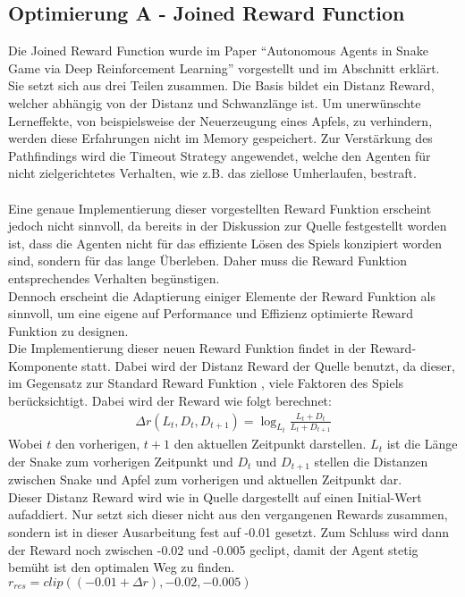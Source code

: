 \subsection{Optimierung A - Joined Reward Function} \label{subsec:Konzept_Optimierung01}
Die Joined Reward Function wurde im Paper "`Autonomous Agents in Snake Game via Deep Reinforcement Learning"' \cite{Autonomous_Agents_in_Snake_Game_via_DRL} vorgestellt und im Abschnitt  erklärt. Sie setzt sich aus drei Teilen zusammen. Die Basis bildet ein Distanz Reward, welcher abhängig von der Distanz und Schwanzlänge ist. Um unerwünschte Lerneffekte, von beispielsweise der Neuerzeugung eines Apfels, zu verhindern, werden diese Erfahrungen nicht im Memory gespeichert. Zur Verstärkung des Pathfindings wird die Timeout Strategy angewendet, welche den Agenten für nicht zielgerichtetes Verhalten, wie z.B. das ziellose Umherlaufen, bestraft.\\
\\Eine genaue Implementierung dieser vorgestellten Reward Funktion erscheint jedoch nicht sinnvoll, da bereits in der Diskussion  zur Quelle \cite{Autonomous_Agents_in_Snake_Game_via_DRL} festgestellt worden ist, dass die Agenten nicht für das effiziente Lösen des Spiels konzipiert worden sind, sondern für das lange Überleben. Daher muss die Reward Funktion entsprechendes Verhalten begünstigen.\\
Dennoch erscheint die Adaptierung einiger Elemente der Reward Funktion als sinnvoll, um eine eigene auf Performance und Effizienz optimierte Reward Funktion zu designen.\\
Die Implementierung dieser neuen Reward Funktion findet in der Reward-Komponente statt. 
Dabei wird der Distanz Reward der Quelle \cite{Autonomous_Agents_in_Snake_Game_via_DRL} benutzt, da dieser, im Gegensatz zur Standard Reward Funktion , viele Faktoren des Spiels berücksichtigt. Dabei wird der Reward wie folgt berechnet:
\begin{align}
	\Delta r(L_t, D_t,D_{t+1}) = \log_{L_t}\frac{L_t + D_t}{L_t + D_{t + 1}}
\end{align}
Wobei $t$ den vorherigen, $t+1$ den aktuellen Zeitpunkt darstellen. $L_t$ ist die Länge der Snake zum vorherigen Zeitpunkt und $D_t$ und $D_{t+1}$ stellen die Distanzen zwischen Snake und Apfel zum vorherigen und aktuellen Zeitpunkt dar.\\
Dieser Distanz Reward wird wie in Quelle \cite{Autonomous_Agents_in_Snake_Game_via_DRL} dargestellt auf einen Initial-Wert aufaddiert. Nur setzt sich dieser nicht aus den vergangenen Rewards zusammen, sondern ist in dieser Ausarbeitung fest auf -0.01 gesetzt. Zum Schluss wird dann der Reward noch zwischen -0.02 und -0.005 geclipt, damit der Agent stetig bemüht ist den optimalen Weg zu finden.
$r_{res} = clip((-0.01 + \Delta r), -0.02, -0.005)$


